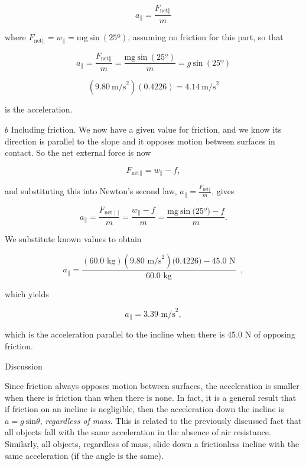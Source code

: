 \documentclass[
]{book}
\newenvironment{tinysection}{}{}
\begin{document}
\leavevmode\hypertarget{eip-id2648920}{}%
\[a_{\parallel} = \frac{F_{\text{net} \parallel}}{m}\]

where
\({{{F_{\text{net} \parallel} = w_{\parallel}} = \text{mg}\ }\text{sin}\ (\text{25º})}{}\),
assuming no friction for this part, so that

\leavevmode\hypertarget{eip-id1172560}{}%
\[a_{\parallel} = \frac{F_{\text{net} \parallel}}{m} = \frac{\text{mg}\ \text{sin}\ (\text{25º})}{m} = g\ \text{sin}\ (\text{25º})\]

\leavevmode\hypertarget{eip-id1165294200578}{}%
\[(9.80\ \text{m/s}^{2})(0.4226) = 4.14\ \text{m/s}^{2}\]

is the acceleration.

\(b\) Including friction. We now have a given value for friction, and we
know its direction is parallel to the slope and it opposes motion
between surfaces in contact. So the net external force is now

\leavevmode\hypertarget{eip-id1959204}{}%
\[{F_{\text{net} \parallel} = {w_{\parallel} - f}},\]

and substituting this into Newton's second law,
\({a_{\parallel} = \frac{F_{\text{net} \parallel}}{m}}{}\)\emph{},
gives

\leavevmode\hypertarget{eip-id1527388}{}%
\[{{{a_{\parallel} = \frac{F_{\text{net} \mid \mid}}{m}} = \frac{w_{\parallel} - f}{m}} = \frac{{\text{mg}\ }\text{sin}\ (\text{25º}{) - f}}{m}}.\]

We substitute known values to obtain

\leavevmode\hypertarget{eip-id1967372}{}%
\[{a_{\parallel} = \frac{(\text{60}\text{.}\text{0\ kg})(9\text{.}\text{80\ m/s}^{2})(0\text{.}\text{4226}{) - \text{45}}\text{.}\text{0\ N}}{\text{60}\text{.}\text{0\ kg}}}\operatorname{},\]

which yields

\leavevmode\hypertarget{eip-id1337555}{}%
\[{{a_{\parallel} = 3}\text{.}\text{39\ m/s}^{2}},\]

which is the acceleration parallel to the incline when there is 45.0 N
of opposing friction.

\begin{tinysection}

{Discussion}

\end{tinysection}

Since friction always opposes motion between surfaces, the acceleration
is smaller when there is friction than when there is none. In fact, it
is a general result that if friction on an incline is negligible, then
the acceleration down the incline is \({{a = g\ }\text{sin}\theta}{}\),
\emph{regardless of mass}. This is related to the previously discussed fact
that all objects fall with the same acceleration in the absence of air
resistance. Similarly, all objects, regardless of mass, slide down a
frictionless incline with the same acceleration (if the angle is the
same).
\end{document}
